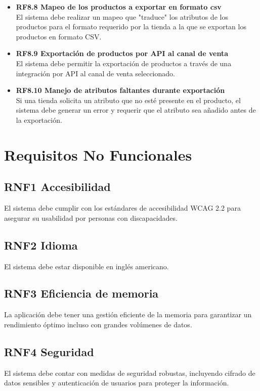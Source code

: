 \documentclass{article}
\begin{document}
\begin{itemize}
    \item \textbf{RF8.8 Mapeo de los productos a exportar en formato csv} \\
    El sistema debe realizar un mapeo que "traduce" los atributos de los productos para el formato requerido por la tienda a la que se exportan los productos en formato CSV.

    \item \textbf{RF8.9 Exportación de productos por API al canal de venta} \\
    El sistema debe permitir la exportación de productos a través de una integración por API al canal de venta seleccionado.

    \item \textbf{RF8.10 Manejo de atributos faltantes durante exportación} \\
    Si una tienda solicita un atributo que no esté presente en el producto, el sistema debe generar un error y requerir que el atributo sea añadido antes de la exportación.
\end{itemize}

\section{Requisitos No Funcionales}
\subsection{RNF1 Accesibilidad}
El sistema debe cumplir con los estándares de accesibilidad WCAG 2.2 para asegurar su usabilidad por personas con discapacidades.

\subsection{RNF2 Idioma}
El sistema debe estar disponible en inglés americano.

\subsection{RNF3 Eficiencia de memoria}
La aplicación debe tener una gestión eficiente de la memoria para garantizar un rendimiento óptimo incluso con grandes volúmenes de datos.

\subsection{RNF4 Seguridad}
El sistema debe contar con medidas de seguridad robustas, incluyendo cifrado de datos sensibles y autenticación de usuarios para proteger la información.
\end{document}
